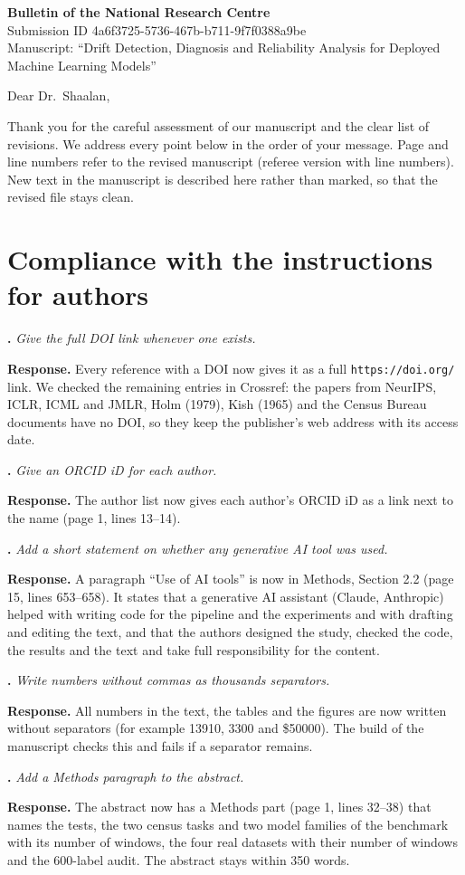 \documentclass[11pt,a4paper]{article}
\newcounter{point}
\newcommand{\point}[1]{\par\medskip\stepcounter{point}\textbf{\thepoint. }\textit{#1}\par}
\newcommand{\reply}{\textbf{Response. }}
\begin{document}
\textbf{Bulletin of the National Research Centre}\\
Submission ID 4a6f3725-5736-467b-b711-9f7f0388a9be\\
Manuscript: ``Drift Detection, Diagnosis and Reliability Analysis for Deployed Machine Learning Models''

\medskip
Dear Dr.\ Shaalan,

Thank you for the careful assessment of our manuscript and the clear list of revisions. We address every point below in the order of your message. Page and line numbers refer to the revised manuscript (referee version with line numbers). New text in the manuscript is described here rather than marked, so that the revised file stays clean.

\section*{Compliance with the instructions for authors}

\point{Give the full DOI link whenever one exists.}
\reply Every reference with a DOI now gives it as a full \texttt{https://doi.org/} link. We checked the remaining entries in Crossref: the papers from NeurIPS, ICLR, ICML and JMLR, Holm (1979), Kish (1965) and the Census Bureau documents have no DOI, so they keep the publisher's web address with its access date.

\point{Give an ORCID iD for each author.}
\reply The author list now gives each author's ORCID iD as a link next to the name (page 1, lines 13--14).

\point{Add a short statement on whether any generative AI tool was used.}
\reply A paragraph ``Use of AI tools'' is now in Methods, Section 2.2 (page 15, lines 653--658). It states that a generative AI assistant (Claude, Anthropic) helped with writing code for the pipeline and the experiments and with drafting and editing the text, and that the authors designed the study, checked the code, the results and the text and take full responsibility for the content.

\point{Write numbers without commas as thousands separators.}
\reply All numbers in the text, the tables and the figures are now written without separators (for example 13910, 3300 and \$50000). The build of the manuscript checks this and fails if a separator remains.

\point{Add a Methods paragraph to the abstract.}
\reply The abstract now has a Methods part (page 1, lines 32--38) that names the tests, the two census tasks and two model families of the benchmark with its number of windows, the four real datasets with their number of windows and the 600-label audit. The abstract stays within 350 words.
\end{document}
